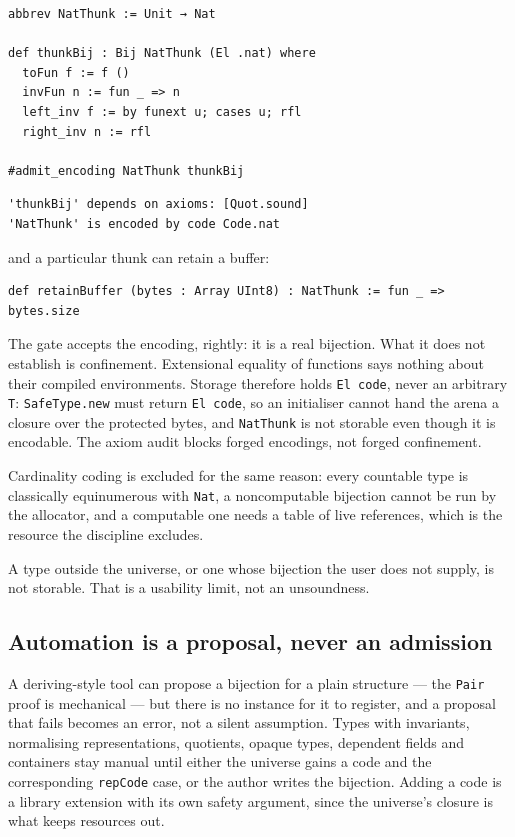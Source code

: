 \documentclass[10pt,a4paper]{article}
\newcommand{\file}[1]{\texttt{\small #1}}
\begin{document}
\begin{lstlisting}[caption={\file{bench/NatThunkAdmission.lean}: a genuine encoding of a function type.}]
abbrev NatThunk := Unit → Nat

def thunkBij : Bij NatThunk (El .nat) where
  toFun f := f ()
  invFun n := fun _ => n
  left_inv f := by funext u; cases u; rfl
  right_inv n := rfl

#admit_encoding NatThunk thunkBij
\end{lstlisting}

\begin{lstlisting}[style=out]
'thunkBij' depends on axioms: [Quot.sound]
'NatThunk' is encoded by code Code.nat
\end{lstlisting}

and a particular thunk can retain a buffer:

\begin{lstlisting}[]
def retainBuffer (bytes : Array UInt8) : NatThunk := fun _ => bytes.size
\end{lstlisting}

The gate accepts the encoding, rightly: it is a real bijection. What it does not
establish is confinement. Extensional equality of functions says nothing about
their compiled environments. Storage therefore holds \texttt{El code}, never an
arbitrary \texttt{T}: \texttt{SafeType.new} must return \texttt{El code}, so an
initialiser cannot hand the arena a closure over the protected bytes, and
\texttt{NatThunk} is not storable even though it is encodable. The axiom audit
blocks forged encodings, not forged confinement.

Cardinality coding is excluded for the same reason: every countable type is
classically equinumerous with \texttt{Nat}, a noncomputable bijection cannot be
run by the allocator, and a computable one needs a table of live references,
which is the resource the discipline excludes.

A type outside the universe, or one whose bijection the user does not supply, is
not storable. That is a usability limit, not an unsoundness.

\subsection*{Automation is a proposal, never an admission}

A deriving-style tool can propose a bijection for a plain structure --- the
\texttt{Pair} proof is mechanical --- but there is no instance for it to register,
and a proposal that fails becomes an error, not a silent assumption. Types with
invariants, normalising representations, quotients, opaque types, dependent
fields and containers stay manual until either the universe gains a code and the
corresponding \texttt{repCode} case, or the author writes the bijection. Adding a
code is a library extension with its own safety argument, since the universe's
closure is what keeps resources out.
\end{document}
